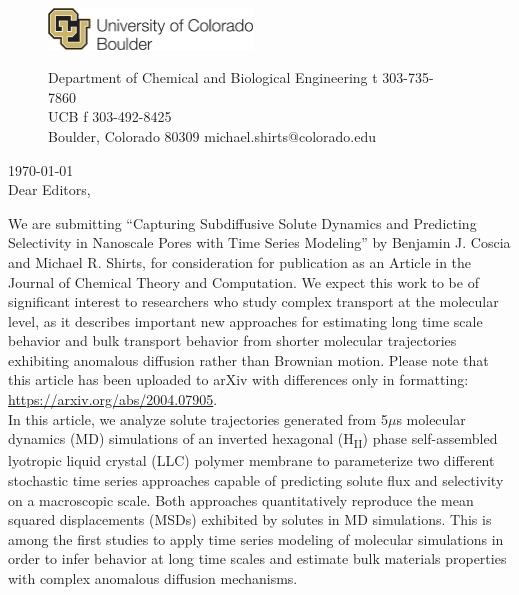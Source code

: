 \documentclass[fontsize=11pt]{article}
\begin{document}
	\graphicspath{{./figures/}}

	\begin{figure}
	\centering
	\begin{minipage}{0.37\textwidth}
	\includegraphics[width=2.14in,left]{CUBoulder.pdf}
	\end{minipage}
	\begin{minipage}{0.62\textwidth}
	\scriptsize
	\noindent Department of Chemical and Biological Engineering \hfill t 303-735-7860~~~~~~~~~~~~~~~~~~ \\
	 UCB \hfill f 303-492-8425~~~~~~~~~~~~~~~~~~ \\
	\noindent Boulder, Colorado 80309 \hfill michael.shirts@colorado.edu \\
	\end{minipage}
	\end{figure}
	
	\noindent \today \\

	\noindent Dear Editors,\\
	
	\newcommand{\ManuscriptTitle}{Capturing Subdiffusive Solute Dynamics and 
	Predicting Selectivity in Nanoscale Pores with Time Series Modeling}
	
	We are submitting ``\ManuscriptTitle'' by Benjamin J. Coscia
        and Michael R.  Shirts, for consideration for publication as
        an Article in the Journal of Chemical Theory and
        Computation. We expect this work to be of significant interest
        to researchers who study complex transport at the molecular
        level, as it describes important new approaches for estimating long
        time scale behavior and bulk transport behavior from shorter
        molecular trajectories exhibiting anomalous diffusion rather
        than Brownian motion. Please note that this article has been
        uploaded to arXiv with differences only in formatting:
        \href{https://arxiv.org/abs/2004.07905}{https://arxiv.org/abs/2004.07905}. \\
	
	In this article, we analyze solute trajectories generated from
        5$\mu$s molecular dynamics (MD) simulations of an inverted
        hexagonal (H\textsubscript{II}) phase self-assembled lyotropic
        liquid crystal (LLC) polymer membrane to parameterize two
        different stochastic time series approaches capable of
        predicting solute flux and selectivity on a macroscopic
        scale. Both approaches quantitatively reproduce the mean
        squared displacements (MSDs) exhibited by solutes in MD
        simulations. This is among the first studies to apply time
        series modeling of molecular simulations in order to infer
        behavior at long time scales and estimate bulk
        materials properties with complex anomalous diffusion
        mechanisms.\\
\end{document}
